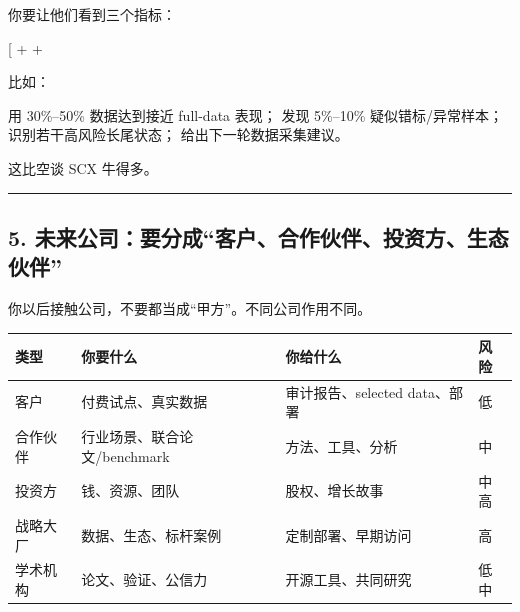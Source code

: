 \documentclass[
  12pt,
]{ctexart}
\newenvironment{Shaded}{}{}
\newcommand{\NormalTok}[1]{#1}
\begin{document}
你要让他们看到三个指标：

{[}  \quad + \quad {} \quad +
\quad \text{发现问题数据}{]}

比如：

\begin{Shaded}
\begin{Highlighting}[]
\NormalTok{用 30\%–50\% 数据达到接近 full{-}data 表现；}
\NormalTok{发现 5\%–10\% 疑似错标/异常样本；}
\NormalTok{识别若干高风险长尾状态；}
\NormalTok{给出下一轮数据采集建议。}
\end{Highlighting}
\end{Shaded}

这比空谈 SCX 牛得多。

\begin{center}\rule{0.5\linewidth}{0.5pt}\end{center}

\subsection{5.
未来公司：要分成``客户、合作伙伴、投资方、生态伙伴''}\label{ux672aux6765ux516cux53f8ux8981ux5206ux6210ux5ba2ux6237ux5408ux4f5cux4f19ux4f34ux6295ux8d44ux65b9ux751fux6001ux4f19ux4f34}

你以后接触公司，不要都当成``甲方''。不同公司作用不同。

\begin{longtable}[]{@{}
  >{\raggedright\arraybackslash}p{}
  >{\raggedright\arraybackslash}p{}
  >{\raggedright\arraybackslash}p{}
  >{\raggedright\arraybackslash}p{}@{}}
\toprule\noalign{}
\begin{minipage}[b]{\linewidth}\raggedright
类型
\end{minipage} & \begin{minipage}[b]{\linewidth}\raggedright
你要什么
\end{minipage} & \begin{minipage}[b]{\linewidth}\raggedright
你给什么
\end{minipage} & \begin{minipage}[b]{\linewidth}\raggedright
风险
\end{minipage} \\
\midrule\noalign{}
\endhead
\bottomrule\noalign{}
\endlastfoot
客户 & 付费试点、真实数据 & 审计报告、selected data、部署 & 低 \\
合作伙伴 & 行业场景、联合论文/benchmark & 方法、工具、分析 & 中 \\
投资方 & 钱、资源、团队 & 股权、增长故事 & 中高 \\
战略大厂 & 数据、生态、标杆案例 & 定制部署、早期访问 & 高 \\
学术机构 & 论文、验证、公信力 & 开源工具、共同研究 & 低中 \\
\end{longtable}
\end{document}
